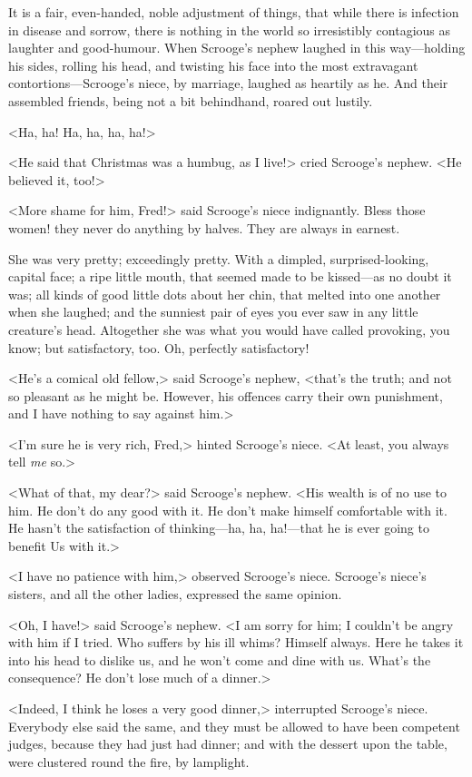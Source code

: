 It is a fair, even-handed, noble adjustment of things, that while there is infection in disease and sorrow, there is nothing in the world so irresistibly contagious as laughter and good-humour.  When Scrooge's nephew laughed in this way—holding his sides, rolling his head, and twisting his face into the most extravagant  contortions—Scrooge's niece, by marriage, laughed as heartily as he. And their assembled friends, being not a bit behindhand, roared out lustily.

<Ha, ha! Ha, ha, ha, ha!>

<He said that Christmas was a humbug, as I live!> cried Scrooge's nephew. <He believed it, too!>

<More shame for him, Fred!> said Scrooge's niece indignantly. Bless those women! they never do anything by halves. They are always in earnest.

She was very pretty; exceedingly pretty. With a dimpled,  surprised-looking, capital face; a ripe little mouth, that seemed made to be kissed—as no doubt it was; all kinds of good little dots about her chin, that melted into one another when she laughed; and the sunniest pair of eyes you ever saw in any little creature's head. Altogether she was what you would have called provoking, you know; but satisfactory, too. Oh, perfectly satisfactory!

<He's a comical old fellow,> said Scrooge's nephew, <that's the truth; and not so pleasant as he might be. However, his offences carry their own punishment, and I have nothing to say against him.>

<I'm sure he is very rich, Fred,> hinted Scrooge's niece. <At least, you always tell \textit{me} so.>

<What of that, my dear?> said Scrooge's nephew. <His wealth is of no use to him. He don't do any good with it. He don't make himself comfortable with it. He hasn't the satisfaction of thinking—ha, ha, ha!—that he is ever going to benefit Us with it.>

<I have no patience with him,> observed Scrooge's niece.  Scrooge's niece's sisters, and all the other ladies, expressed the same opinion.

<Oh, I have!> said Scrooge's nephew. <I am sorry for him; I couldn't be angry with him if I tried. Who suffers by his ill whims? Himself always. Here he takes it into his head to dislike us, and he won't come and dine with us. What's the consequence? He don't lose much of a dinner.>

<Indeed, I think he loses a very good dinner,> interrupted  Scrooge's niece. Everybody else said the same, and they must be allowed to have been competent judges, because they had just had dinner; and with the dessert upon the table, were clustered round the fire, by lamplight.

